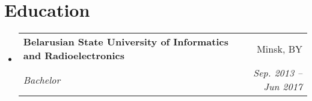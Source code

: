 \documentclass[letterpaper,11pt]{article}
\makeatletter
\newcommand{\resumeSubheading}[4]{
  \vspace{-2pt}\item
    \begin{tabular*}{0.97\textwidth}[t]{l@{\extracolsep{\fill}}r}
      \textbf{#1} & #2 \\
      \textit{\small#3} & \textit{\small #4} \\
    \end{tabular*}\vspace{-7pt}
}
\newcommand{\resumeSubHeadingListStart}{\begin{itemize}[leftmargin=0.15in, label={}]}
\newcommand{\resumeSubHeadingListEnd}{\end{itemize}}
\makeatother
\begin{document}
\section{Education}
  \resumeSubHeadingListStart
    \resumeSubheading
      {Belarusian State University of Informatics and Radioelectronics }{Minsk, BY}
      {Bachelor}{Sep. 2013 -- Jun 2017}
  \resumeSubHeadingListEnd

\end{document}
